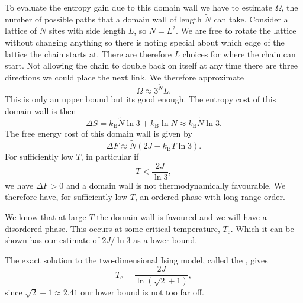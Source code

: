 \documentclass[fleqn]{NotesClass}
\newcommand*{\boltzmann}{k_{\mathrm{B}}}
\begin{document}
    To evaluate the entropy gain due to this domain wall we have to estimate \(\Omega\), the number of possible paths that a domain wall of length \(\tilde{N}\) can take.
    Consider a lattice of \(N\) sites with side length \(L\), so \(N = L^2\).
    We are free to rotate the lattice without changing anything so there is noting special about which edge of the lattice the chain starts at.
    There are therefore \(L\) choices for where the chain can start.
    Not allowing the chain to double back on itself at any time there are three directions we could place the next link.
    We therefore approximate
    \begin{equation}
        \Omega \approx 3^{\tilde{N}}L.
    \end{equation}
    This is only an upper bound but its good enough.
    The entropy cost of this domain wall is then
    \begin{equation}
        \Delta S = \boltzmann \tilde{N} \ln 3 + \boltzmann \ln N \approx \boltzmann \tilde{N} \ln 3.
    \end{equation}
    The free energy cost of this domain wall is given by
    \begin{equation}
        \Delta F \approx \tilde{N}(2J - \boltzmann T \ln 3).
    \end{equation}
    For sufficiently low \(T\), in particular if
    \begin{equation}
        T < \frac{2J}{\ln 3},
    \end{equation}
    we have \(\Delta F > 0\) and a domain wall is not thermodynamically favourable.
    We therefore have, for sufficiently low \(T\), an ordered phase with long range order.
    
    We know that at large \(T\) the domain wall is favoured and we will have a disordered phase.
    This occurs at some critical temperature, \(T_{\mathrm{c}}\).
    Which it can be shown has our estimate of \(2J/\ln 3\) as a lower bound.
    
    The exact solution to the two-dimensional Ising model, called the , gives
    \begin{equation}
        T_{\mathrm{c}} = \frac{2J}{\ln (\sqrt{2} + 1)},
    \end{equation}
    since \(\sqrt{2} + 1 \approx 2.41\) our lower bound is not too far off.
    
\end{document}
